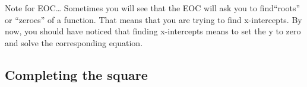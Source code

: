 %

%
%
%
%
%
%
%
%
%
%
%
%
%


Note for EOC\ldots{} Sometimes you will see that the EOC will ask you to find``roots'' or ``zeroes'' of a function. That means that you are trying to find x-intercepts. By now, you should have noticed that finding x-intercepts means to set the y to zero and solve the corresponding equation.

\subsection{Completing the square}


